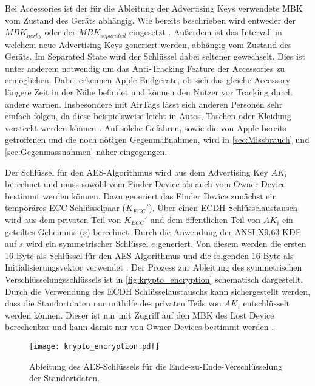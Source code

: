 Bei Accessories ist der für die Ableitung der Advertising Keys verwendete \ac{MBK} vom Zustand des Geräts abhängig.
Wie bereits beschrieben wird entweder der $MBK_{nerby}$ oder der  $MBK_{separated}$ eingesetzt \cite{Apple_FindMySpec}.
Außerdem ist das Intervall in welchem neue Advertising Keys generiert werden, abhängig vom Zustand des Geräts.
Im Separated State wird der Schlüssel dabei seltener gewechselt.
Dies ist unter anderem notwendig um das Anti-Tracking Feature der Accessories zu ermöglichen.
Dabei erkennen Apple-Endgeräte, ob sich das gleiche Accessory längere Zeit in der Nähe befindet und können den Nutzer vor Tracking durch andere warnen.
Insbesondere mit AirTags lässt sich anderen Personen sehr einfach folgen, da diese beispielsweise leicht in Autos, Taschen oder Kleidung versteckt werden können \cite{Heinrich_AirGuard}.
Auf solche Gefahren, sowie die von Apple bereits getroffenen und die noch nötigen Gegenmaßnahmen, wird in \autoref{sec:Missbrauch} und \autoref{sec:Gegenmassnahmen} näher eingegangen.


Der Schlüssel für den \ac{AES}-Algorithmus wird aus dem Advertising Key $AK_i$ berechnet und muss sowohl vom Finder Device als auch vom Owner Device bestimmt werden können.
Dazu generiert das Finder Device zunächst ein temporäres \ac{ECC}-Schlüsselpaar ($K_{ECC}'$).
Über einen \ac{ECDH} Schlüsselaustausch wird aus dem privaten Teil von $K_{ECC}'$ und dem öffentlichen Teil von $AK_i$ ein geteiltes Geheimnis ($s$) berechnet.
Durch die Anwendung der ANSI X9.63-\ac{KDF} auf $s$ wird ein symmetrischer Schlüssel $e$ generiert.
Von diesem werden die ersten 16 Byte als Schlüssel für den \ac{AES}-Algorithmus und die folgenden 16 Byte als Initialisierungsvektor verwendet \cite{Heinrich_FindMy}.
Der Prozess zur Ableitung des symmetrischen Verschlüsselungsschlüssels ist in \autoref{fig:krypto_encryption} schematisch dargestellt.
Durch die Verwendung des \ac{ECDH} Schlüsselaustauschs kann sichergestellt werden, dass die Standortdaten nur mithilfe des privaten Teils von $AK_i$ entschlüsselt werden können.
Dieser ist nur mit Zugriff auf den \ac{MBK} des Lost Device berechenbar und kann damit nur von Owner Devices bestimmt werden \cite{Heinrich_FindMy}.

\begin{figure}[ht]
    \centering
    \texttt{[image: krypto\_encryption.pdf]}
    \caption{Ableitung des \ac{AES}-Schlüssels für die Ende-zu-Ende-Verschlüsselung der Standortdaten.}
    \label{fig:krypto_encryption}
\end{figure}

